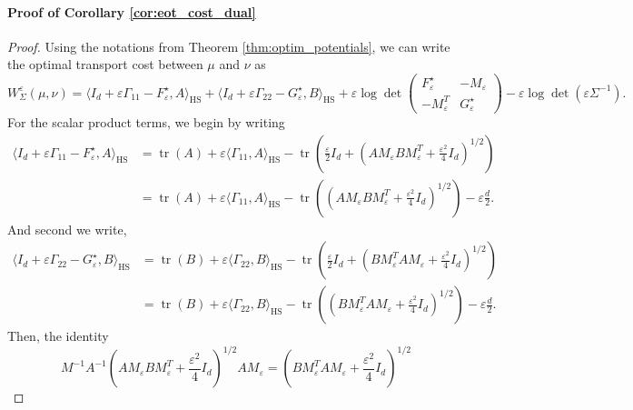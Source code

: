 \documentclass[]{article}
\DeclareMathOperator{\tr}{tr}
\DeclareMathOperator{\HS}{HS}
\numberwithin{equation}{section}
\theoremstyle{plain}
\begin{document}
{\paragraph{Proof of Corollary \ref{cor:eot_cost_dual}}


\begin{proof}
	Using the notations from Theorem \ref{thm:optim_potentials}, we can write the optimal transport cost between $\mu$ and $\nu$ as
	\begin{equation*}
		W_\Sigma^{\varepsilon}(\mu, \nu) = \langle I_d+\varepsilon \Gamma_{11} - F_{\varepsilon}^{\star}, A \rangle_{\HS} + \langle I_d + \varepsilon \Gamma_{22} - G_\varepsilon^{\star}, B \rangle_{\HS} + \varepsilon \log \det \begin{pmatrix}
			F_\varepsilon^{\star}  & -M_{\varepsilon}    \\
			-M_{\varepsilon}^T&    G_\varepsilon^{\star}
		\end{pmatrix} - \varepsilon \log \det(\varepsilon \Sigma^{-1}).
	\end{equation*}
	For the scalar product terms, we begin by writing 
	\begin{align*}
		\langle I_d +\varepsilon \Gamma_{11} - F_{\varepsilon}^{\star}, A \rangle_{\HS} & = \tr(A) + \varepsilon \langle \Gamma_{11}, A \rangle_{\HS} - \tr\left(\frac{\varepsilon}{2}I_d+ \left(AM_{\varepsilon}BM_{\varepsilon}^T+ \frac{\varepsilon^2}{4}I_d \right)^{1/2} \right) \\
		&  =  \tr(A) + \varepsilon \langle \Gamma_{11}, A \rangle_{\HS} - \tr\left( \left(AM_{\varepsilon}BM_{\varepsilon}^T+ \frac{\varepsilon^2}{4}I_d \right)^{1/2} \right) - \varepsilon \frac{d}{2}.
	\end{align*}
	And second we write, 
	\begin{align*}
		\langle I_d+\varepsilon \Gamma_{22}- G_{\varepsilon}^{\star}, B \rangle_{\HS} & = \tr(B) + \varepsilon \langle \Gamma_{22}, B \rangle_{\HS} - \tr\left(\frac{\varepsilon}{2}I_d +\left(BM_{\varepsilon}^T AM_{\varepsilon}+ \frac{\varepsilon^2}{4}I_d \right)^{1/2} \right) \\
		& = \tr(B) + \varepsilon \langle \Gamma_{22}, B \rangle_{\HS} - \tr\left(\left(BM_\varepsilon^T AM_{\varepsilon}+ \frac{\varepsilon^2}{4}I_d \right)^{1/2} \right) - \varepsilon \frac{d}{2}.
	\end{align*}
	Then, the identity
	\begin{equation*}
		M^{-1}A^{-1}\left(AM_{\varepsilon}BM_{\varepsilon}^T+ \frac{\varepsilon^2}{4}I_d  \right)^{1/2} AM_{\varepsilon}=\left(BM_{\varepsilon}^T AM_{\varepsilon}+ \frac{\varepsilon^2}{4}I_d  \right)^{1/2}

\end{equation*}
\end{proof}}
\end{document}
